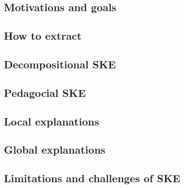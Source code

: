 \subsection{Motivations and goals}\label{subsec:ske-motivations-and-goals}

\subsection{How to extract}\label{subsec:how-to-extract}

\subsection{Decompositional \ac{SKE}}\label{subsec:decompositional-ske}

\subsection{Pedagocial \ac{SKE}}\label{subsec:pedagogical-ske}

\subsection{Local explanations}\label{subsec:local-explanations}

\subsection{Global explanations}\label{subsec:global-explanations}

\subsection{Limitations and challenges of \ac{SKE}}\label{subsec:limitations-and-challenges-of-ske}